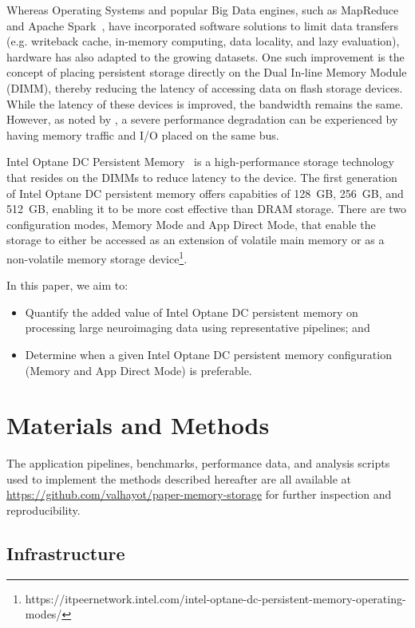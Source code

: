 \documentclass[conference]{IEEEtran}
\begin{document}
Whereas Operating Systems and popular Big Data engines, such as MapReduce~\cite{mapreduce} and Apache Spark~\cite{spark}, have
incorporated software solutions to limit data transfers (e.g. writeback cache, in-memory computing,
data locality, and lazy evaluation), hardware has also adapted to the growing datasets.
One such improvement is the concept of placing persistent storage directly on the Dual
In-line Memory Module (DIMM), thereby reducing the latency of accessing data on 
flash storage devices. While the latency of these devices is improved, the bandwidth
remains the same. However, as noted by \cite{nvdimms}, a severe performance degradation
can be experienced by having memory traffic and I/O placed on the same bus.


Intel Optane DC Persistent Memory~\cite{optanebrief} is a high-performance
storage technology that resides on the DIMMs to reduce latency to the device.
The first generation of Intel Optane DC persistent memory offers capabities of 128~GB,
256~GB, and 512~GB, enabling it to be more cost effective than DRAM storage.
There are two configuration modes, Memory Mode and App Direct Mode,
that enable the storage to either be accessed as an extension of volatile main memory
or as a non-volatile memory storage device\footnote{https://itpeernetwork.intel.com/intel-optane-dc-persistent-memory-operating-modes/}.


In this paper, we aim to:
\begin{itemize}
        \item Quantify the added value of Intel Optane DC persistent memory on 
            processing large neuroimaging data using representative pipelines; and
        \item Determine when a given Intel Optane DC persistent memory configuration (Memory 
            and App Direct Mode) is preferable.
\end{itemize}

\section{Materials and Methods}
The application pipelines, benchmarks, performance data, and analysis scripts used 
to implement the methods described hereafter are all available at 
\url{https://github.com/valhayot/paper-memory-storage} for 
further inspection and reproducibility.

\subsection{Infrastructure}
\end{document}
